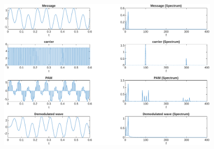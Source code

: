 \begin{figure}[!ht]
	\centering
	\includegraphics[width=\textwidth]{img/pam.pdf}
\end{figure}

\pagebreak